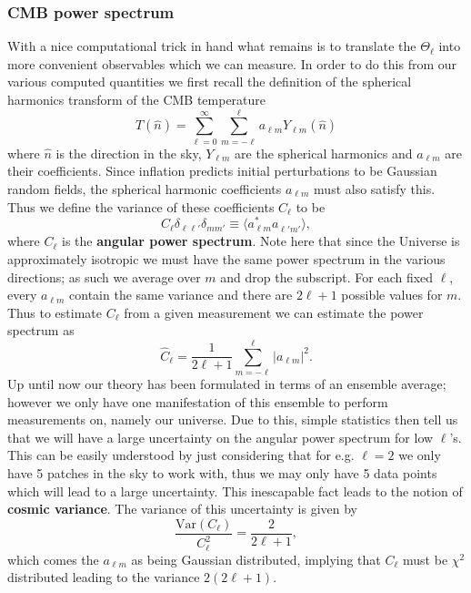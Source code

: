 \documentclass[%
reprint,
 amsmath,amssymb,
 aps,
]{revtex4-2}
\begin{document}
\subsubsection{CMB power spectrum}
With a nice computational trick in hand what remains is to translate the $\Theta_\ell$ into more convenient observables which we can measure. In order to do this from our various computed quantities we first recall the definition of the spherical harmonics transform of the CMB temperature
\[T(\hat{n})=\sum_{\ell=0}^\infty\sum_{m=-\ell}^\ell a_{\ell m}Y_{\ell m}(\hat n)\]
where $\hat{n}$ is the direction in the sky, $Y_{\ell m}$ are the spherical harmonics and $a_{\ell m}$ are their coefficients. Since inflation predicts initial perturbations to be Gaussian random fields, the spherical harmonic coefficients $a_{\ell m}$ must also satisfy this. Thus we define the variance of these coefficients $C_\ell$ to be
\[C_\ell\delta_{\ell\ell'}\delta_{mm'}\equiv\langle a_{\ell m}^*a_{\ell' m'}^{\phantom{*}}\rangle,\]
where $C_\ell$ is the \textbf{angular power spectrum}. Note here that since the Universe is approximately isotropic we must have the same power spectrum in the various directions; as such we average over $m$ and drop the subscript. For each fixed $\ell$, every $a_{\ell m}$ contain the same variance and there are $2\ell+1$ possible values for $m$. Thus to estimate $C_\ell$ from a given measurement we can estimate the power spectrum as
\[\hat C_\ell=\frac{1}{2\ell+1}\sum_{m=-\ell}^\ell |a_{\ell m}|^2.\]
Up until now our theory has been formulated in terms of an ensemble average; however we only have one manifestation of this ensemble to perform measurements on, namely our universe. Due to this, simple statistics then tell us that we will have a large uncertainty on the angular power spectrum for low $\ell$'s. This can be easily understood by just considering that for e.g. $\ell=2$ we only have 5 patches in the sky to work with, thus we may only have 5 data points which will lead to a large uncertainty. This inescapable fact leads to the notion of \textbf{cosmic variance}. The variance of this uncertainty is given by \cite{AST5220LectureNotes}
\[\frac{\text{Var}(C_\ell)}{C_\ell^2}=\frac{2}{2\ell+1},\]
which comes the $a_{\ell m}$ as being Gaussian distributed, implying that $C_\ell$ must be $\chi^2$ distributed leading to the variance $2(2\ell+1)$.
\end{document}
